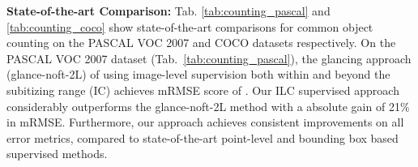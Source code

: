 \documentclass[10pt,twocolumn,letterpaper]{article}
\begin{document}
\begin{table}[t]
\caption{State-of-the-art counting performance comparison on the Pascal VOC 2007 count-test. Our ILC supervised approach outperforms existing methods.}\label{tab:counting_pascal}
\end{table}











 
 


\noindent\textbf{State-of-the-art Comparison:}
Tab. \ref{tab:counting_pascal} and \ref{tab:counting_coco} show state-of-the-art comparisons for common object counting on the PASCAL VOC 2007 and COCO datasets respectively.  On the PASCAL VOC 2007 dataset (Tab.~\ref{tab:counting_pascal}), the glancing approach (glance-noft-2L) of \cite{Chattopadhyay_2017_CVPR} using image-level supervision both within and beyond the subitizing range (IC) achieves mRMSE score of . Our ILC supervised approach considerably outperforms the glance-noft-2L method with a absolute gain of 21\% in mRMSE. Furthermore, our approach  achieves consistent improvements on all error metrics, compared to state-of-the-art point-level and bounding box based supervised methods. 
\end{document}
